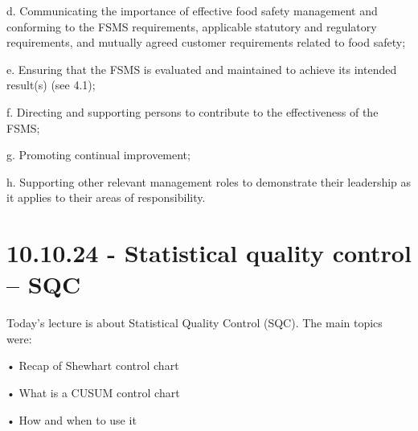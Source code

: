 d. Communicating the importance of effective food safety management and conforming to the FSMS requirements, applicable statutory and regulatory requirements, and mutually agreed customer requirements related to food safety;

e. Ensuring that the FSMS is evaluated and maintained to achieve its intended result(s) (see 4.1);

f. Directing and supporting persons to contribute to the effectiveness of the FSMS;

g. Promoting continual improvement;

h. Supporting other relevant management roles to demonstrate their leadership as it applies to their areas of responsibility.


\section{10.10.24 - Statistical quality control – SQC}

Today's lecture is about Statistical Quality Control (SQC). The main topics were:

• Recap of Shewhart control chart

• What is a CUSUM control chart

• How and when to use it

